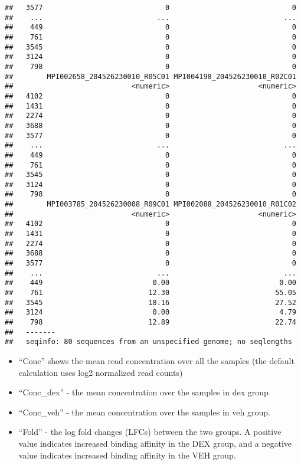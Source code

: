 \documentclass[
]{article}
\providecommand{\tightlist}{%
  \setlength{\itemsep}{0pt}\setlength{\parskip}{0pt}}
\begin{document}
\begin{verbatim}
##   3577                             0                             0
##    ...                           ...                           ...
##    449                             0                             0
##    761                             0                             0
##   3545                             0                             0
##   3124                             0                             0
##    798                             0                             0
##        MPI002658_204526230010_R05C01 MPI004198_204526230010_R02C01
##                            <numeric>                     <numeric>
##   4102                             0                             0
##   1431                             0                             0
##   2274                             0                             0
##   3688                             0                             0
##   3577                             0                             0
##    ...                           ...                           ...
##    449                             0                             0
##    761                             0                             0
##   3545                             0                             0
##   3124                             0                             0
##    798                             0                             0
##        MPI003785_204526230008_R09C01 MPI002088_204526230010_R01C02
##                            <numeric>                     <numeric>
##   4102                             0                             0
##   1431                             0                             0
##   2274                             0                             0
##   3688                             0                             0
##   3577                             0                             0
##    ...                           ...                           ...
##    449                          0.00                          0.00
##    761                         12.30                         55.05
##   3545                         18.16                         27.52
##   3124                          0.00                          4.79
##    798                         12.89                         22.74
##   -------
##   seqinfo: 80 sequences from an unspecified genome; no seqlengths
\end{verbatim}

\begin{itemize}
\tightlist
\item
  ``Conc'' shows the mean read concentration over all the samples (the
  default calculation uses log2 normalized read counts)
\item
  ``Conc\_dex'' - the mean concentration over the samples in dex group
\item
  ``Conc\_veh'' - the mean concentration over the samples in veh group.
\item
  ``Fold'' - the log fold changes (LFCs) between the two groups. A
  positive value indicates increased binding affinity in the DEX group,
  and a negative value indicates increased binding affinity in the VEH
  group.
\end{itemize}
\end{document}
